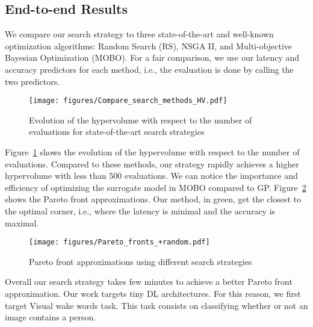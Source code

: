 \documentclass[conference]{IEEEtran}
\begin{document}
\subsection{End-to-end Results}


We compare our search strategy to three state-of-the-art and well-known optimization algorithms: Random Search (RS), NSGA II, and Multi-objective Bayesian Optimization (MOBO). For a fair comparison, we use our latency and accuracy predictors for each method, i.e., the evaluation is done by calling the two predictors. 

\begin{figure}
    \centering
    \texttt{[image: figures/Compare\_search\_methods\_HV.pdf]}
    \caption{Evolution of the hypervolume with respect to the number of evaluations for state-of-the-art search strategies}
    \label{fig:search_evolution}
    \vspace{-0.5cm}
\end{figure}

Figure~\ref{fig:search_evolution} shows the evolution of the hypervolume with respect to the number of evaluations. Compared to these methods, our strategy rapidly achieves a higher hypervolume with less than 500 evaluations. We can notice the importance and efficiency of optimizing the surrogate model in MOBO compared to GP. Figure~\ref{fig:pareto_fronts} shows the Pareto front approximations. Our method, in green, get the closest to the optimal corner, i.e., where the latency is minimal and the accuracy is maximal. 

\begin{figure}
    \centering
    \texttt{[image: figures/Pareto\_fronts\_+random.pdf]}
    \caption{Pareto front approximations using different search strategies}
    \label{fig:pareto_fronts}
    \vspace{-0.75cm}
\end{figure}

Overall our search strategy takes few minutes to achieve a better Pareto front approximation. Our work targets tiny DL architectures. For this reason, we first target Visual wake words task. This task consists on classifying whether or not an image contains a person.
\end{document}
